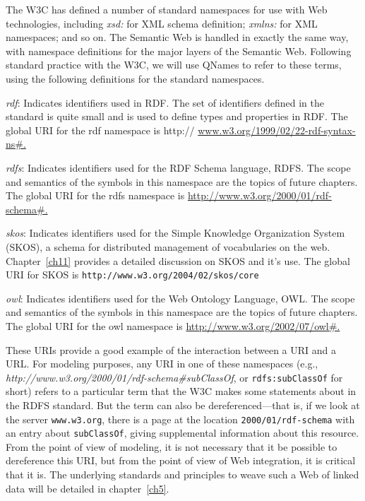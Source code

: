The W3C has defined a number of standard namespaces for use with Web
technologies, including \emph{xsd:} for XML schema definition;
\emph{xmlns:} for XML namespaces; and so on. The Semantic Web is handled
in exactly the same way, with namespace definitions for the major layers
of the Semantic Web. Following standard practice with the W3C, we will
use QNames to refer to these terms, using the following definitions for
the standard namespaces.

\emph{rdf}: Indicates identifiers used in RDF. The set of identifiers defined
in the standard is quite small and is used to define types and
properties in RDF. The global URI for the rdf namespace is http://
\href{http://www.w3.org/1999/02/22-rdf-syntax-ns}{www.w3.org/1999/02/22-rdf-syntax-ns\#.}

\emph{rdfs}: Indicates identifiers used for the RDF Schema language, RDFS. The
scope and semantics of the symbols in this namespace are the topics of
future chapters. The global URI for the rdfs namespace is
\href{http://www.w3.org/2000/01/rdf-schema}{http://www.w3.org/2000/01/rdf-schema\#.}

\emph{skos}: Indicates identifiers used for the Simple Knowledge Organization System (SKOS), a schema for
distributed management of vocabularies on the web.  
Chapter~\ref{ch11} provides a detailed discussion on SKOS and it's use.   The global URI  for SKOS  is
\texttt{http://www.w3.org/2004/02/skos/core}


\emph{owl}: Indicates identifiers used for the Web Ontology Language, OWL. The
scope and semantics of the symbols in this namespace are the topics of
future chapters. The global URI for the owl namespace is
\href{http://www.w3.org/2002/07/owl}{http://www.w3.org/2002/07/owl\#.}

These URIs provide a good example of the interaction between a URI and a
URL. For modeling purposes, any URI in one of these namespaces (e.g.,
\emph{http://www.w3.org/2000/01/rdf-schema\#subClassOf}, or
\texttt{rdfs:subClassOf} for short) refers to a particular term that the W3C
makes some statements about in the RDFS standard. But the term can also
be dereferenced---that is, if we look at the server
\texttt{www.w3.org}, there is a page at the location
\texttt{2000/01/rdf-schema} with an entry about \texttt{subClassOf}, giving supplemental
information about this resource. From the point of view of modeling, it
is not necessary that it be possible to dereference this URI, but from
the point of view of Web integration, it is critical that it is. The
underlying standards and principles to weave such a Web of linked data
will be detailed in chapter~\ref{ch5}.

